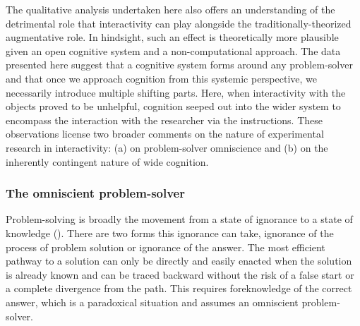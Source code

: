\documentclass[twocolumn, serif, empirical, authordate]{jote-article}
\begin{document}
The qualitative analysis undertaken here also offers an understanding of the detrimental role that interactivity can play alongside the traditionally-theorized augmentative role. In hindsight, such an effect is theoretically more plausible given an open cognitive system and a non-computational approach. The data presented here suggest that a cognitive system forms around any problem-solver and that once we approach cognition from this systemic perspective, we necessarily introduce multiple shifting parts. Here, when interactivity with the objects proved to be unhelpful, cognition seeped out into the wider system to encompass the interaction with the researcher via the instructions. These observations license two broader comments on the nature of experimental research in interactivity: (a) on problem-solver omniscience and (b) on the inherently contingent nature of wide cognition. 

\subsubsection*{The omniscient problem-solver}
\vskip3pt
Problem-solving is broadly the movement from a state of ignorance to a state of knowledge (). There are two forms this ignorance can take, ignorance of the process of problem solution or ignorance of the answer. The most efficient pathway to a solution can only be directly and easily enacted when the solution is already known and can be traced backward without the risk of a false start or a complete divergence from the path. This requires foreknowledge of the correct answer, which is a paradoxical situation and assumes an omniscient problem-solver. 
\end{document}
